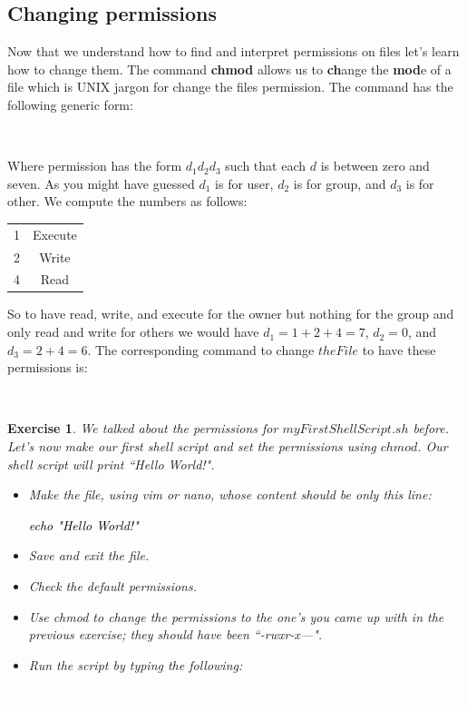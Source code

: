 \documentclass[oneside]{book}
\newcommand{\commandline}[1]{\begin{center} \colorbox{Dark}{\textcolor{white}{#1}} \end{center}}
\newcommand{\exampleout}[1]{\begin{center} \colorbox{Light}{\textcolor{black}{#1}} \end{center}}
\newtheorem{ex}{Exercise}[chapter]
\begin{document}
\subsection{Changing permissions}
Now that we understand how to find and interpret permissions on files let's learn how to change them. The command \textbf{chmod} allows us to \textbf{ch}ange the \textbf{mod}e of a file which is UNIX jargon for change the files permission.
The command has the following generic form:
\commandline{chmod permissions file1 file2 ...}
Where permission has the form $d_1d_2d_3$ such that each $d$ is between zero and seven. As you might have guessed $d_1$ is for user, $d_2$ is for group, and $d_3$ is for other. We compute the numbers as follows: \\
\begin{center}
\begin{tabular}{|c|c|}
    \hline
    1 & Execute  \\ 
    2 & Write   \\ 
    4 & Read \\ \hline
\end{tabular}
\end{center}

So to have read, write, and execute for the owner but nothing for the group and only read and write for others we would have $d_1 = 1 + 2 + 4 = 7$, $d_2 = 0$, and $d_3 = 2 + 4 = 6$. The corresponding command to change $theFile$ to have these permissions is:
\commandline{chmod 706 theFile}

\begin{ex}
    We talked about the permissions for $myFirstShellScript.sh$ before. Let's now make our first shell script and set the permissions using $chmod$. Our shell script will print ``Hello World!".
    \begin{itemize}
        \item Make the file, using vim or nano, whose content should be only this line:
            \exampleout{echo "Hello World!"}
        \item Save and exit the file.
        \item Check the default permissions.
        \item Use chmod to change the permissions to the one's you came up with in the previous exercise; they should have been ``-rwxr-x---".
        \item Run the script by typing the following:
            \commandline{./myFirstShellScript.sh}
    \end{itemize}
\end{ex}
\end{document}
